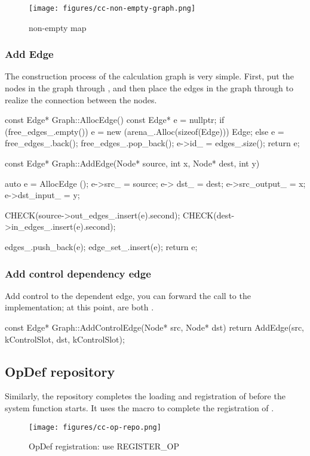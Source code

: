 \begin{content}
\begin{figure}[H]
  \centering
  \texttt{[image: figures/cc-non-empty-graph.png]}
  \caption{non-empty map}
  \label{fig:cc-non-empty-graph}
\end{figure}


\subsubsection{Add Edge}
The construction process of the calculation graph is very simple. First, put the nodes in the graph through , and then place the edges in the graph through  to realize the connection between the nodes.

\begin{leftbar}
\begin{c++}
const Edge* Graph::AllocEdge() const {
  Edge* e = nullptr;
  if (free_edges_.empty()) {
    e = new (arena_.Alloc(sizeof(Edge))) Edge;
  } else {
    e = free_edges_.back();
    free_edges_.pop_back();
  }
  e->id_ = edges_.size();
  return e;
}

const Edge* Graph::AddEdge(Node* source, int x, Node* dest, int y) {
  auto e = AllocEdge ();
  e->src_ = source;
  e-> dst_ = dest;
  e->src_output_ = x;
  e->dst_input_ = y;

  CHECK(source->out_edges_.insert(e).second);
  CHECK(dest->in_edges_.insert(e).second);

  edges_.push_back(e);
  edge_set_.insert(e);
  return e;
}
\end{c++}
\end{leftbar}


\subsubsection{Add control dependency edge}
Add control to the dependent edge, you can forward the call to the  implementation; at this point,  are both .

\begin{leftbar}
\begin{c++}
const Edge* Graph::AddControlEdge(Node* src, Node* dst) {
  return AddEdge(src, kControlSlot, dst, kControlSlot);
}
\end{c++}
\end{leftbar}


\subsection{OpDef repository}
Similarly, the  repository completes the loading and registration of  before the system function starts. It uses the  macro to complete the registration of .

\begin{figure}[H]
  \centering
  \texttt{[image: figures/cc-op-repo.png]}
  \caption{OpDef registration: use REGISTER\_OP}
  \label{fig:cc-op-repo}
\end{figure}

\end{content}


